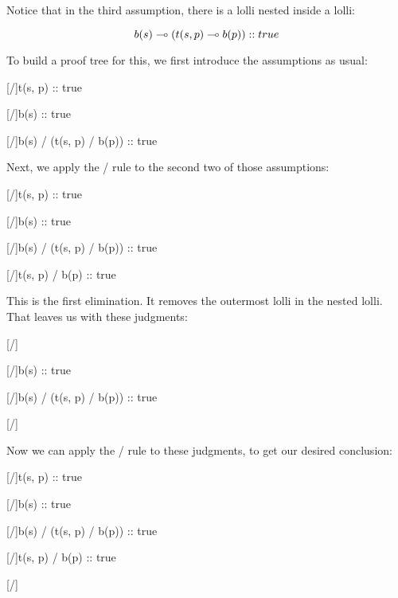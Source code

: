 \documentclass[../../../main.tex]{subfiles}
\begin{document}
\noindent
Notice that in the third assumption, there is a lolli nested inside a lolli:

\begin{equation*}
  b(s) \lolli/ (t(s, p) \lolli/ b(p)) :: true
\end{equation*}

\noindent
To build a proof tree for this, we first introduce the assumptions as usual:

\begin{prooftree*}
  \hypo{}
  [\startrule/]{t(s, p) :: true}

  \hypo{}
  [\startrule/]{b(s) :: true}

  \hypo{}
  [\startrule/]{b(s) \lolli/ (t(s, p) \lolli/ b(p)) :: true}  

\end{prooftree*}

\noindent
Next, we apply the \lolliElim/ rule to the second two of those assumptions:

\begin{prooftree*}
  \hypo{}
  [\startrule/]{t(s, p) :: true}

  \hypo{}
  [\startrule/]{b(s) :: true}

  \hypo{}
  [\startrule/]{b(s) \lolli/ (t(s, p) \lolli/ b(p)) :: true}  

  [\lolliElim/]{t(s, p) \lolli/ b(p) :: true}

\end{prooftree*}

\noindent
This is the first elimination. It removes the outermost lolli in the nested lolli. That leaves us with these judgments:

\begin{prooftree*}
  \hypo{}
  [\startrule/]{}

  \hypo{}
  [\startrule/]{b(s) :: true}

  \hypo{}
  [\startrule/]{b(s) \lolli/ (t(s, p) \lolli/ b(p)) :: true}  

  [\lolliElim/]{}

\end{prooftree*}

\noindent
Now we can apply the \lolliElim/ rule to these judgments, to get our desired conclusion:

\begin{prooftree*}
  \hypo{}
  [\startrule/]{t(s, p) :: true}

  \hypo{}
  [\startrule/]{b(s) :: true}

  \hypo{}
  [\startrule/]{b(s) \lolli/ (t(s, p) \lolli/ b(p)) :: true}  

  [\lolliElim/]{t(s, p) \lolli/ b(p) :: true}

  [\lolliElim/]{}
\end{prooftree*}
\end{document}
